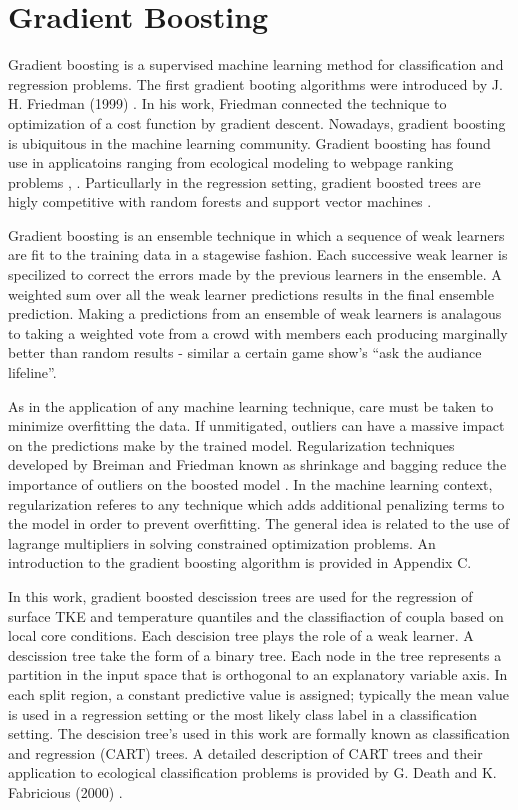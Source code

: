 \section{Gradient Boosting}

Gradient boosting is a supervised machine learning method for classification and regression problems.
The first gradient booting algorithms were introduced by J. H. Friedman (1999) \cite{friedman2001}.  In his work, Friedman connected the technique to optimization of a cost function by gradient descent.
Nowadays, gradient boosting is ubiquitous in the machine learning community.  Gradient boosting has found use in applicatoins ranging from ecological modeling \cite{death2007} to webpage ranking problems \cite{Tyree2011}, \cite{chapelle2011}.  Particullarly in the regression setting, gradient boosted trees are higly competitive with random forests and support vector machines \cite{moisen2006}. 

Gradient boosting is an ensemble technique in which a sequence of weak learners are fit to the training data in a stagewise fashion.  Each successive weak learner is specilized to correct the errors made by the previous learners in the ensemble.  A weighted sum over all the weak learner predictions results in the final ensemble prediction.  Making a predictions from an ensemble of weak learners is analagous to taking a weighted vote from a crowd with members each producing marginally better than random results - similar a certain game show's ``ask the audiance lifeline''.  

As in the application of any machine learning technique, care must be taken to minimize overfitting the data.  If unmitigated, outliers can have a massive impact on the predictions make by the trained model.  Regularization techniques developed by Breiman and Friedman known as shrinkage and bagging reduce the importance of outliers on the boosted model \cite{breiman1996}.  In the machine learning context, regularization referes to any technique which adds additional penalizing terms to the model in order to prevent overfitting.  The general idea is related to the use of lagrange multipliers in solving constrained optimization problems.  An introduction to the gradient boosting algorithm is provided in Appendix C.

In this work, gradient boosted descission trees are used for the regression of surface TKE and temperature quantiles and the classifiaction of coupla based on local core conditions.   Each descision tree plays the role of a weak learner.  A descission tree take the form of a binary tree.  Each node in the tree represents a partition in the input space that is orthogonal to an explanatory variable axis.  In each split region, a constant predictive value is assigned; typically the mean value is used in a regression setting or the most likely class label in a classification setting.  The descision tree's used in this work are formally known as classification and regression (CART) trees.  A detailed description of CART trees and their application to ecological classification problems is provided by G. Death and K. Fabricious (2000) \cite{death2000}. 

